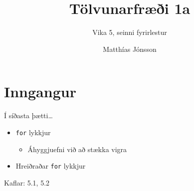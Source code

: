 \documentclass{beamer}
\author{Matthías Jónsson}
\title{Tölvunarfræði 1a}
\subtitle{Vika 5, seinni fyrirlestur}
\begin{document}
\begin{frame}
\titlepage
\end{frame}

\section{Inngangur}

\begin{frame}{Í síðasta þætti\ldots}
\begin{itemize}
 \item \texttt{for} lykkjur
 \begin{itemize}
  \item Áhyggjuefni við að stækka vigra
 \end{itemize}
 \item Hreiðraðar \texttt{for} lykkjur
\end{itemize}
Kaflar: 5.1, 5.2
\end{frame}
\end{document}
